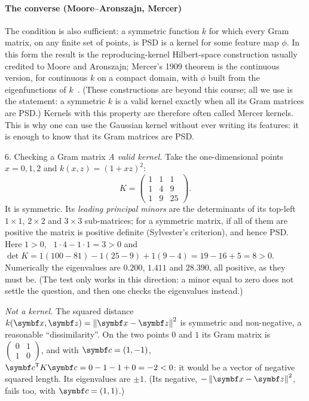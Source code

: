 \documentclass[11pt]{article}
\newcommand{\z}{\vect{z}}
\begin{document}
\paragraph{The converse (Moore--Aronszajn, Mercer)} The condition is also sufficient: a symmetric function $k$ for which
every Gram matrix, on any finite set of points, is PSD is a kernel for some feature map $\phi$. In this form the result is
the reproducing-kernel Hilbert-space construction usually credited to Moore and Aronszajn; Mercer's 1909 theorem is the
continuous version, for continuous $k$ on a compact domain, with $\phi$ built from the eigenfunctions of
$k$~\cite{mercer1909,scholkopf2002}. (These constructions are beyond this course; all we use is the statement: a
symmetric $k$ is a valid kernel exactly when all its Gram matrices are PSD.) Kernels with this property are therefore
often called Mercer kernels. This is why one
can use the Gaussian kernel without ever writing its features: it is enough to know that its Gram matrices are PSD.

\begin{worked}{6. Checking a Gram matrix}
\emph{A valid kernel.} Take the one-dimensional points $x = 0, 1, 2$ and $k(x, z) = (1 + xz)^2$:
\[
  K = \begin{pmatrix} 1 & 1 & 1 \\ 1 & 4 & 9 \\ 1 & 9 & 25 \end{pmatrix}.
\]
It is symmetric. Its \emph{leading principal minors} are the determinants of its top-left $1 \times 1$, $2 \times 2$
and $3 \times 3$ sub-matrices; for a symmetric matrix, if all of them are positive the matrix is positive definite
(Sylvester's criterion), and hence PSD. Here $1 > 0$, \ $1 \cdot 4 - 1 \cdot 1 = 3 > 0$ and
$\det K = 1(100 - 81) - 1(25 - 9) + 1(9 - 4) = 19 - 16 + 5 = 8 > 0$. Numerically the eigenvalues are $0.200$, $1.411$
and $28.390$, all positive, as they must be. (The test only works in this direction: a minor equal to zero does not
settle the question, and then one checks the eigenvalues instead.)

\emph{Not a kernel.} The squared distance $k(\x, \z) = \norm{\x - \z}^2$ is symmetric and non-negative, a reasonable
``dissimilarity''. On the two points $0$ and $1$ its Gram matrix is $\begin{pmatrix} 0 & 1 \\ 1 & 0 \end{pmatrix}$, and
with $\vect{c} = (1, -1)$, $\vect{c}\T K\vect{c} = 0 - 1 - 1 + 0 = -2 < 0$: it would be a vector of negative squared
length. Its eigenvalues are $\pm 1$. (Its negative, $-\norm{\x - \z}^2$, fails too, with $\vect{c} = (1, 1)$.)
\end{worked}
\end{document}
